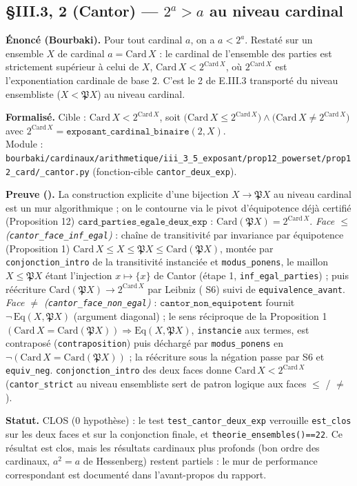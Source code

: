 \subsection{§III.3, \theoreme{} 2 (Cantor) --- $2^{a} > a$ au niveau cardinal}
\textbf{Énoncé (Bourbaki).} Pour tout cardinal $a$, on a $a < 2^{a}$. Restaté sur
un ensemble $X$ de cardinal $a = \mathrm{Card}\,X$ : le cardinal de l'ensemble des
parties est strictement supérieur à celui de $X$, $\mathrm{Card}\,X < 2^{\mathrm{Card}\,X}$,
où $2^{\mathrm{Card}\,X}$ est l'exponentiation cardinale de base $2$. C'est le
\theoreme{} 2 de E.III.3 transporté du niveau ensembliste ($X < \mathfrak{P}X$) au
niveau cardinal.

\textbf{Formalisé.} Cible : $\mathrm{Card}\,X < 2^{\mathrm{Card}\,X}$, soit
$\bigl(\mathrm{Card}\,X \le 2^{\mathrm{Card}\,X}\bigr) \wedge \bigl(\mathrm{Card}\,X \neq 2^{\mathrm{Card}\,X}\bigr)$
avec $2^{\mathrm{Card}\,X} = \texttt{exposant\_cardinal\_binaire}(2, X)$. \\
Module : \texttt{bourbaki/cardinaux/arithmetique/iii\_3\_5\_exposant/prop12\_powerset/prop12\_card/\_cantor.py}
(fonction-cible \texttt{cantor\_deux\_exp}).

\textbf{Preuve (\Nstar).} La construction explicite d'une bijection $X \to \mathfrak{P}X$
au niveau cardinal est un mur algorithmique ; on le contourne via le pivot d'équipotence
déjà certifié (Proposition 12) $\texttt{card\_parties\_egale\_deux\_exp}$ :
$\mathrm{Card}(\mathfrak{P}X) = 2^{\mathrm{Card}\,X}$. \emph{Face $\le$
(\texttt{cantor\_face\_inf\_egal})} : chaîne de transitivité par invariance par équipotence
(Proposition 1) $\mathrm{Card}\,X \le X \le \mathfrak{P}X \le \mathrm{Card}(\mathfrak{P}X)$,
montée par \texttt{conjonction\_intro} de la transitivité instanciée et
\texttt{modus\_ponens}, le maillon $X \le \mathfrak{P}X$ étant l'injection $x \mapsto \{x\}$
de Cantor (étape 1, \texttt{inf\_egal\_parties}) ; puis réécriture
$\mathrm{Card}(\mathfrak{P}X) \to 2^{\mathrm{Card}\,X}$ par Leibniz (\noyau{} S6) suivi de
\texttt{equivalence\_avant}. \emph{Face $\neq$ (\texttt{cantor\_face\_non\_egal})} :
$\texttt{cantor\_non\_equipotent}$ fournit $\neg\,\mathrm{Eq}(X, \mathfrak{P}X)$
(argument diagonal) ; le sens réciproque de la Proposition 1
$(\mathrm{Card}\,X = \mathrm{Card}(\mathfrak{P}X)) \Rightarrow \mathrm{Eq}(X, \mathfrak{P}X)$,
\texttt{instancie} aux termes, est contraposé (\texttt{contraposition}) puis déchargé par
\texttt{modus\_ponens} en $\neg(\mathrm{Card}\,X = \mathrm{Card}(\mathfrak{P}X))$ ; la
réécriture sous la négation passe par S6 et \texttt{equiv\_neg}. \texttt{conjonction\_intro}
des deux faces donne $\mathrm{Card}\,X < 2^{\mathrm{Card}\,X}$ (\texttt{cantor\_strict} au
niveau ensembliste sert de patron logique aux faces $\le$ / $\neq$).

\textbf{Statut.} CLOS (0 hypothèse) : le test \texttt{test\_cantor\_deux\_exp} verrouille
\texttt{est\_clos} sur les deux faces et sur la conjonction finale, et
\texttt{theorie\_ensembles()==22}. Ce résultat est clos, mais les résultats cardinaux plus
profonds (bon ordre des cardinaux, $a^{2} = a$ de Hessenberg) restent partiels : le mur de
performance correspondant est documenté dans l'avant-propos du rapport.
